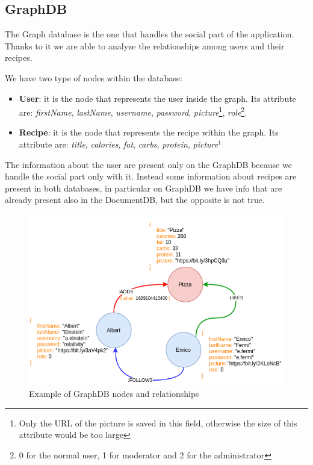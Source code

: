 \documentclass[a4paper]{report}
\begin{document}
\subsection{GraphDB}
The Graph database is the one that handles the social part of the application. Thanks to it we are able to analyze the relationships among users and their recipes.

\noindent We have two type of nodes within the database:
\begin{itemize}
	\item \textbf{User}: it is the node that represents the user inside the graph. Its attribute are: \emph{firstName}, \emph{lastName}, \emph{username}, \emph{password}, \emph{picture}\footnote{Only the URL of the picture is saved in this field, otherwise the size of this attribute would be too large}, \emph{role}\footnote{0 for the normal user, 1 for moderator and 2 for the administrator}.
	
	\item \textbf{Recipe}: it is the node that represents the recipe within the graph. Its attribute are: \emph{title}, \emph{calories}, \emph{fat}, \emph{carbs}, \emph{protein}, \emph{picture}$^1$
\end{itemize}

\noindent The information about the user are present only on the GraphDB because we handle the social part only with it. Instead some information about recipes are present in both databases, in particular on GraphDB we have info that are already present also in the DocumentDB, but the opposite is not true.

\begin{figure}[htpb]
	\centering
	\includegraphics[scale=0.6]{img/graphDbModel.png}
	\caption{Example of GraphDB nodes and relationships}
\end{figure}
\end{document}
